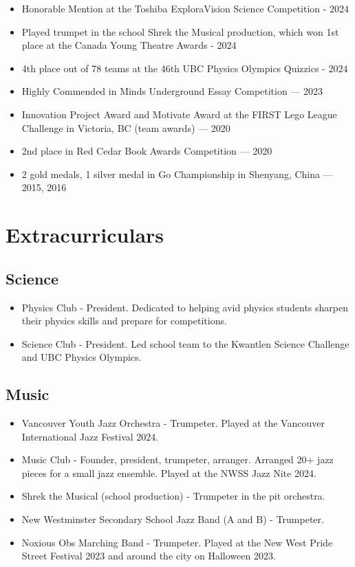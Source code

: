 \documentclass{article}
\begin{document}
\begin{itemize}
	\item Honorable Mention at the Toshiba ExploraVision Science Competition - 2024
	\item Played trumpet in the school Shrek the Musical production, which won 1st place at the Canada Young Theatre Awards - 2024
	\item 4th place out of 78 teams at the 46th UBC Physics Olympics Quizzics - 2024
	\item Highly Commended in Minds Underground Essay Competition — 2023
	\item Innovation Project Award and Motivate Award at the FIRST Lego League Challenge in Victoria, BC (team awards) — 2020
	\item 2nd place in Red Cedar Book Awards Competition — 2020
	\item 2 gold medals, 1 silver medal in Go Championship in Shenyang, China — 2015, 2016
\end{itemize}

\section*{Extracurriculars}

\subsection*{Science}

\begin{itemize}
	\item Physics Club - President. Dedicated to helping avid physics students sharpen their physics skills and prepare for competitions.
	\item Science Club - President. Led school team to the Kwantlen Science Challenge and UBC Physics Olympics.
\end{itemize}

\subsection*{Music}

\begin{itemize}
	\item Vancouver Youth Jazz Orchestra - Trumpeter. Played at the Vancouver International Jazz Festival 2024.
	\item Music Club - Founder, president, trumpeter, arranger. Arranged 20+ jazz pieces for a small jazz ensemble. Played at the NWSS Jazz Nite 2024.
	\item Shrek the Musical (school production) - Trumpeter in the pit orchestra.
	\item New Westminster Secondary School Jazz Band (A and B) - Trumpeter.
	\item Noxious Obs Marching Band - Trumpeter. Played at the New West Pride Street Festival 2023 and around the city on Halloween 2023.
\end{itemize}
\end{document}
